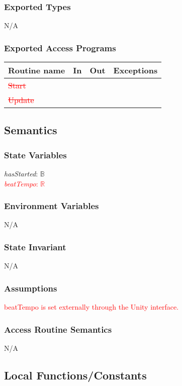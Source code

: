 \documentclass[12pt]{article}
\begin{document}
\subsubsection {Exported Types}
N/A

\subsubsection {Exported Access Programs}

\begin{tabular}{| l | l | l | l |}
\hline
\textbf{Routine name} & \textbf{In} & \textbf{Out} & \textbf{Exceptions}\\
\hline
\textcolor{red}{\sout{Start}} & & & \\
\hline
\textcolor{red}{\sout{Update}} & & & \\
\hline
\end{tabular}

\subsection {Semantics}

\subsubsection {State Variables}
\textit{hasStarted}: $\mathbb{B}$ \\
\textcolor{red}{\textit{beatTempo}: $\mathbb{R}$}

\subsubsection {Environment Variables}
N/A

\subsubsection {State Invariant}
N/A

\subsubsection {Assumptions}
\textcolor{red}{beatTempo is set externally through the Unity interface.}

\subsubsection {Access Routine Semantics}
N/A

\subsection{Local Functions/Constants}
\end{document}
